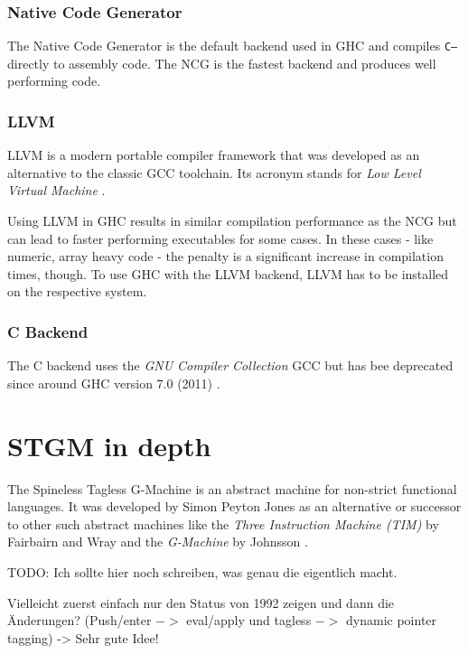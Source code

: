 \documentclass[runningheads]{llncs}
\begin{document}
\subsubsection{Native Code Generator}
The Native Code Generator is the default backend used in GHC and compiles \texttt{C--} directly to assembly code. The NCG is the fastest backend and produces well performing code. \cite{GHCmanual}

\subsubsection{LLVM}
LLVM is a modern portable compiler framework that was developed as an alternative to the classic GCC toolchain. Its acronym stands for \textit{Low Level Virtual Machine} \cite{lattner2004llvm}.

Using LLVM in GHC results in similar compilation performance as the NCG but can lead to faster performing executables for some cases. In these cases - like numeric, array heavy code - the penalty is a significant increase in compilation times, though. To use GHC with the LLVM backend, LLVM has to be installed on the respective system.\cite{GHCmanual}

\subsubsection{C Backend}
The C backend uses the \textit{GNU Compiler Collection} GCC but has bee deprecated since around GHC version 7.0 (2011) \cite{GHCmanual}.





\section{STGM in depth}
\label{sec:stgm}

The Spineless Tagless G-Machine is an abstract machine for non-strict functional languages.
It was developed by Simon Peyton Jones as an alternative or successor to other such abstract machines like the \textit{Three Instruction Machine (TIM)} by Fairbairn and Wray \cite{fairbairn1987tim} and the \textit{G-Machine} by Johnsson \cite{johnsson1984efficient}.

TODO: Ich sollte hier noch schreiben, was genau die eigentlich macht.


Vielleicht zuerst einfach nur den Status von 1992 zeigen und dann die Änderungen? (Push/enter $->$ eval/apply und tagless $->$ dynamic pointer tagging)
-> Sehr gute Idee!
\end{document}
